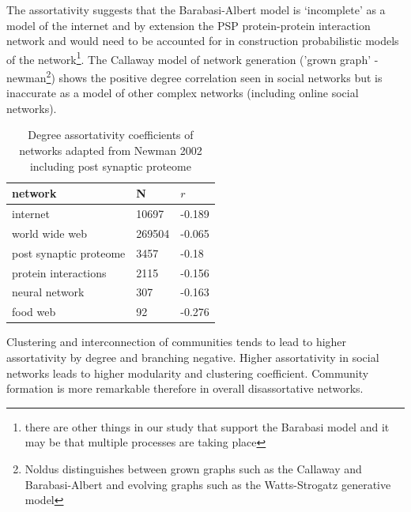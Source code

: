 The assortativity suggests that the Barabasi-Albert model is `incomplete' as a model of the internet \cite{newman2002assortative} and by extension the PSP protein-protein interaction network and would need to be accounted for in construction probabilistic models of the network\footnote{there are other things in our study that support the Barabasi model and it may be that multiple processes are taking place}. 
The Callaway model of network generation ('grown graph' - newman\footnote{Noldus distinguishes between grown graphs such as the Callaway and Barabasi-Albert and evolving graphs such as the Watts-Strogatz generative model}) shows the positive degree correlation seen in social networks but is inaccurate as a model of other complex networks (including online social networks). 


\begin{table}[]
    \centering
    \begin{tabular}{lll}
    \toprule
       network  &N& $r$  \\
       \midrule
       internet & 10697&-0.189\\
       world wide web &269504 & -0.065\\
       post synaptic proteome & 3457 & -0.18\\
       protein interactions & 2115 & -0.156\\
       neural network & 307 & -0.163\\
       food web & 92 & -0.276 \\
       \bottomrule
    \end{tabular}
    \caption{Degree assortativity coefficients of networks adapted from Newman 2002 \cite{newman2002assortative} including post synaptic proteome}
    \label{Table:DegreeAssortativityNewman}
\end{table}

 

Clustering and interconnection of communities tends to lead to higher assortativity by degree and branching negative\cite{estrada2011combinatorial}\cite{noldus2015assortativity}. Higher assortativity in social networks leads to higher modularity and clustering coefficient\cite{noldus2015assortativity}. Community formation is more remarkable therefore in overall disassortative networks. 

